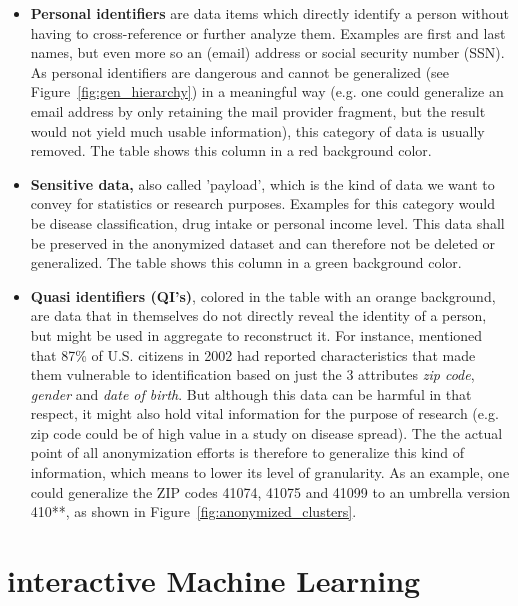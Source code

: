 \documentclass{llncs}
\begin{document}
\begin{itemize}
	\item \textbf{Personal identifiers} are data items which directly identify a person without having to cross-reference or further analyze them. Examples are first and last names, but even more so an (email) address or social security number (SSN). As personal identifiers are dangerous and cannot be generalized (see Figure~\ref{fig:gen_hierarchy}) in a meaningful way (e.g. one could generalize an email address by only retaining the mail provider fragment, but the result would not yield much usable information), this category of data is usually removed. The table shows this column in a red background color.
	\item \textbf{Sensitive data,} also called 'payload', which is the kind of data we want to convey for statistics or research purposes. Examples for this category would be disease classification, drug intake or personal income level. This data shall be preserved in the anonymized dataset and can therefore not be deleted or generalized. The table shows this column in a green background color.
	\item \textbf{Quasi identifiers (QI's)}, colored in the table with an orange background, are data that in themselves do not directly reveal the identity of a person, but might be used in aggregate to reconstruct it. For instance, \cite{sweeney2002k} mentioned that 87\% of U.S. citizens in 2002 had reported characteristics that made them vulnerable to identification based on just the 3 attributes \textit{zip code}, \textit{gender} and \textit{date of birth}. But although this data can be harmful in that respect, it might also hold vital information for the purpose of research (e.g. zip code could be of high value in a study on disease spread). The the actual point of all anonymization efforts is therefore to generalize this kind of information, which means to lower its level of granularity. As an example, one could generalize the ZIP codes 41074, 41075 and 41099 to an umbrella version 410**, as shown in Figure~\ref{fig:anonymized_clusters}.
\end{itemize}



\section{interactive Machine Learning}
\label{sect:iML}
\end{document}
